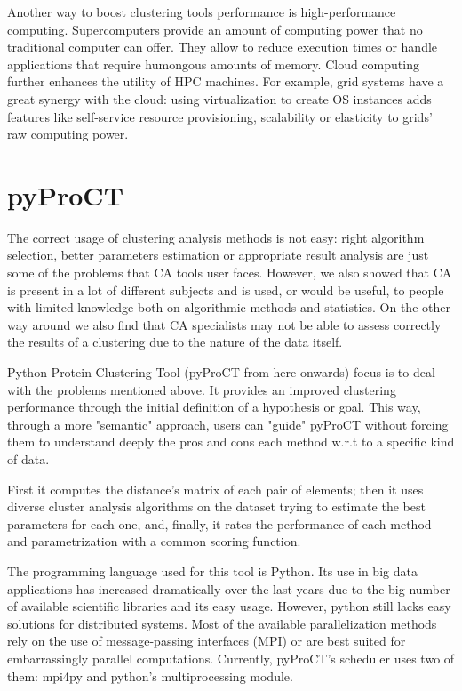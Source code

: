 Another way to boost clustering tools performance is high-performance computing. Supercomputers provide an amount of computing power that no traditional computer can offer. They allow to reduce execution times or handle applications that require humongous amounts of memory. Cloud computing further enhances the utility of HPC machines. For example, grid systems have a great synergy with the cloud: using virtualization to create OS instances adds features like self-service resource provisioning, scalability or elasticity to grids' raw computing power.\cite{Armbrust2010}\cite{Foster2008}



\section{pyProCT}

The correct usage of clustering analysis methods is not easy: right algorithm selection, better parameters estimation or appropriate result analysis are just some of the problems that CA tools user faces. However, we also showed that CA is present in a lot of different subjects and is used, or would be useful, to people with  limited knowledge both on algorithmic methods and statistics. On the other way around we also find that CA specialists may not be able to assess correctly the results of a clustering due to the nature of the data itself.

Python Protein Clustering Tool \cite{Gil2014} (pyProCT from here onwards) focus is to deal with the problems mentioned above. It provides an improved clustering performance through the initial definition of a hypothesis or goal. This way, through a more "semantic" approach, users can "guide" pyProCT without forcing them to understand deeply the pros and cons each method w.r.t to a specific kind of data.

First it computes the distance's matrix of each pair of elements; then it uses diverse cluster analysis algorithms on the dataset trying to estimate the best parameters for each one, and, finally, it rates the performance of each method and parametrization with a common scoring function.

The programming language used for this tool is Python. Its use in big data applications has increased dramatically over the last years due to the big number of available scientific libraries and its easy usage. However, python still lacks easy solutions for distributed systems. Most of the available parallelization methods rely on the use of message-passing interfaces (MPI) or are best suited for embarrassingly parallel computations. Currently, pyProCT's scheduler uses two of them: mpi4py \cite{Dalcin2008} and python's multiprocessing module.

